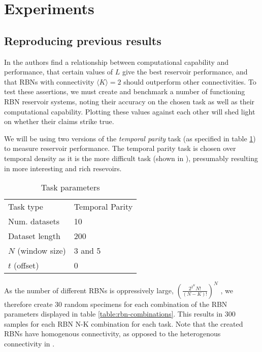 \section{Experiments}

\subsection{Reproducing previous results}

In \cite{rbn-reservoir} the authors find a relationship between computational capability and performance,
that certain values of $L$ give the best reservoir performance,
and that RBNs with connectivity $\langle K \rangle =2$ should outperform other connectivities.
To test these assertions,
we must create and benchmark a number of functioning RBN reservoir systems,
noting their accuracy on the chosen task as well as their computational capability.
Plotting these values against each other will shed light on whether their claims strike true.

We will be using two versions of the \textit{temporal parity} task
(as specified in table \ref{table:task-parameters}) to measure reservoir performance.
The temporal parity task is chosen over temporal density as it is the more difficult task
(shown in \cite{rbn-reservoir}), presumably resulting in more interesting and rich resevoirs.

\begin{table}[h]
  \centering
  \caption{Task parameters}
  \label{table:task-parameters}
  \begin{tabular}{ll}
    Task type         & Temporal Parity \\
    Num. datasets     & 10              \\
    Dataset length    & 200             \\
    $N$ (window size) & 3 and 5         \\
    $t$ (offset)      & 0               \\
  \end{tabular}
\end{table}


As the number of different RBNs is oppressively large,
$(\frac{2^{2^{K}}N!}{(N-K)!})^N$ \cite{gershenson2004introduction},
we therefore create 30 random specimens for each combination of the RBN parameters displayed in table \ref{table:rbn-combinations}.
This results in 300 samples for each RBN N-K combination for each task.
Note that the created RBNs have homogenous connectivity,
as opposed to the heterogenous connectivity in \cite{rbn-reservoirs}.

